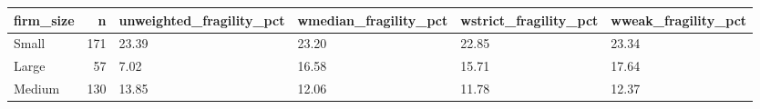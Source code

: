 \begin{tabular}{lrllll}
\toprule
firm\_size & n & unweighted\_fragility\_pct & wmedian\_fragility\_pct & wstrict\_fragility\_pct & wweak\_fragility\_pct \\
\midrule
Small & 171 & 23.39 & 23.20 & 22.85 & 23.34 \\
Large & 57 & 7.02 & 16.58 & 15.71 & 17.64 \\
Medium & 130 & 13.85 & 12.06 & 11.78 & 12.37 \\
\bottomrule
\end{tabular}
